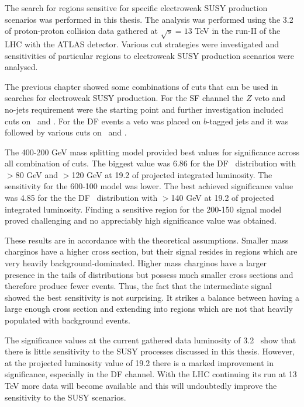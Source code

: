 The search for regions sensitive for specific electroweak SUSY production scenarios was performed in this thesis. The analysis was performed using the 3.2 \invfb of proton-proton collision data  gathered at $\sqrt{s}=13$ TeV in the run-II of the LHC with the ATLAS detector. Various cut strategies were investigated and sensitivities of particular regions to electroweak SUSY production scenarios were analysed. 

The previous chapter showed some combinations of cuts that can be used in searches for electroweak SUSY production. For the SF channel the $Z$ veto and no-jets requirement were the starting point and further investigation included cuts on \metrel \, and \mttwo. For the DF events a veto was placed on $b$-tagged jets and it was followed by various cuts on \metrel \, and \mttwo. 

The 400-200 GeV mass splitting model provided best values for significance across all combination of cuts. The biggest value was 6.86 for the DF \mttwo \, distribution  with \metrel$>$80 GeV and \mttwo$>$120 GeV at 19.2 \invfb of projected integrated luminosity.
The sensitivity for the 600-100 model was lower. The best achieved significance value was 4.85 for the the DF \mttwo \, distribution  with \mttwo$>$140 GeV at 19.2 \invfb of projected integrated luminosity. Finding a sensitive region for the 200-150 signal model proved challenging and no appreciably high significance value was obtained.

These results are in accordance with the theoretical assumptions. Smaller mass charginos have a higher cross section, but their signal resides in regions which are very heavily background-dominated. Higher mass charginos have a larger presence in the tails of distributions but possess much smaller cross sections and therefore produce fewer events. Thus, the fact that the intermediate signal showed the best sensitivity is not surprising. It strikes a balance between having a large enough cross section and extending into regions which are not that heavily populated with background events.

The significance values at the current gathered data luminosity of 3.2 \invfb \, show that there is little sensitivity to the SUSY processes discussed in this thesis. However, at the projected luminosity value of 19.2 \invfb there is a marked improvement in significance, especially in the DF channel. With the LHC continuing its run at 13 TeV more data will become available and this will undoubtedly improve the sensitivity to the SUSY scenarios. 







